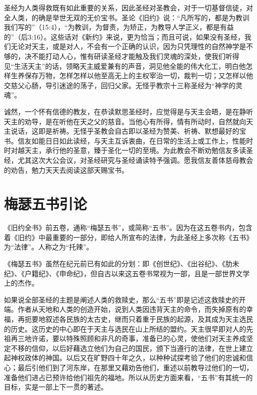 圣经为人类得救既有如此重要的关系，因此圣经对圣教会，对于一切基督信徒，对全人类，的确是举世无双的无价宝书。圣\UL[保禄]论《旧约》说：“凡所写的，都是为教训我们写的”（15:4），“为教训，为督责，为矫正，为教导人学正义，都是有益的”（后3:16）。这些话对《新约》来说，更为恰当；而且可说，如果没有圣经，我们无论对天主，或是对人，不会有一个正确的认识，因为只凭理性的自然神学是不够的，决不能打动人心，惟有研读圣经才能触及我们灵魂的深处，使我们听得见“生活天主”的话，领略天主威爱兼有的声音，洞见他全能的伟大化工，明白他怎样生养保存万物，怎样怎样以他至高无上的主权宰治一切，裁判一切；又怎样以他交慈父心肠，导引迷途的荡子，回归父家。无怪乎教宗\UL[良]十三称圣经为“神学的灵魂”。

诚然，一个怀有信德的教友，在恭读默思圣经时，应觉得是与天主会晤，是在静听天主的劝导，是在听他在天之父的慈音。当他心有所得，情有所动时，自然就向天主说话，这即是祈祷。无怪乎圣教会自古即以圣经为赞美、祈祷、默想最好的宝书。信友如能日日如此读经，与天主互诉衷曲，在日常的生活上或工作上，性能时时对越天主，承行他的圣意，臻于圣化一切的至境。为此教会不断劝勉信友多读圣经，尤其这次大公会议，对圣经研究与圣经诵读特予强调。愿我信友善体慈母教会的劝告，勉力天天去阅读这部天赐宝书。


\chapter*{梅瑟五书引论}
《旧约全书》前五卷，通称“梅瑟五书”，或简称“五书”。因为在这五卷书内，包含着《旧约》中最重要的一部分，即\UL[梅瑟]给\UL[以色列]人所宣布的法律，为此圣经上多次称《五书》为“法律”。\UL[希伯来]人称之为“托辣”。

《梅瑟五书》虽然在纪元前已有如此的分划：即《创世纪》、《出谷纪》、《肋未纪》、《户籍纪》、《申命纪》，但自古以来这五卷书常视为一部，且是一部世界文学上的杰作。

如果说全部圣经的主题是阐述人类的救赎史，那么“五书”即是记述这救赎史的开端。作者从天地和人类的创造开始，说到人类因违背天主的命令，而失掉原有的幸福，再扼要地叙述各民族的太古史，继而只着重于\UL[以色列]民族的起源，及其成为天主选民的历史。这历史的中心即在于天主与选民在\UL[西乃]山上所结的盟约。天主很早即对\UL[以色列]人的先祖再三地许诺，要以特殊照顾和非凡的奇事，准备\UL[以]已的心灵，使他们对天主养成坚定不移的信仰，以后好藉\UL[梅瑟]选立他们为自己的国民，颁下当遵行的法律，在世上建立起神权政体的神国。以后又在旷野四十年之久，以种种试探考验了他们的忠诚和信心；最后引他们到了\UL[约但]河东岸，在那里又藉\UL[梅瑟]劝告他们，重述以前教导过他们的一切，准备他们进占已预许给他们祖先的福地。所以从历史方面来看，“五书”有其统一的目标，实是一部上下一贯的著述。

